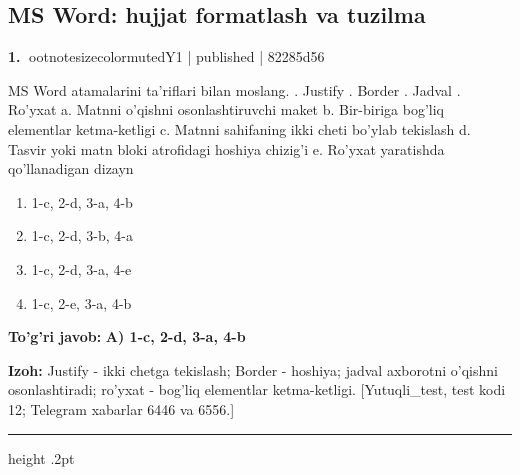 \documentclass[10pt,a4paper]{article}
\begin{document}
\subsection{MS Word: hujjat formatlash va tuzilma}

\textbf{\color{ink}1.} {ootnotesizecolor{muted}Y1 | published | 82285d56}
\par
MS Word atamalarini ta'riflari bilan moslang. \newline  {}. Justify . Border . Jadval . Ro'yxat \newline  \newline a. Matnni o'qishni osonlashtiruvchi maket \newline b. Bir-biriga bog'liq elementlar ketma-ketligi \newline c. Matnni sahifaning ikki cheti bo'ylab tekislash \newline d. Tasvir yoki matn bloki atrofidagi hoshiya chizig'i \newline e. Ro'yxat yaratishda qo'llanadigan dizayn
\begin{enumerate}[label=\Alph*),leftmargin=9mm]
\item 1-c, 2-d, 3-a, 4-b
\item 1-c, 2-d, 3-b, 4-a
\item 1-c, 2-d, 3-a, 4-e
\item 1-c, 2-e, 3-a, 4-b
\end{enumerate}
\begin{tcolorbox}[enhanced,breakable,colback=teal!4,colframe=teal!55!black,boxrule=0.45pt,arc=1.2mm,left=2.8mm,right=2.8mm,top=2mm,bottom=2mm]
\textbf{\color{teal}To'g'ri javob:} \textbf{A) 1-c, 2-d, 3-a, 4-b}
\par\smallskip
\textbf{Izoh:} Justify - ikki chetga tekislash; Border - hoshiya; jadval axborotni o'qishni osonlashtiradi; ro'yxat - bog'liq elementlar ketma-ketligi. [Yutuqli\_test, test kodi 12; Telegram xabarlar 6446 va 6556.]
\end{tcolorbox}
\vspace{2mm}\hrule height .2pt\vspace{2mm}
\end{document}
